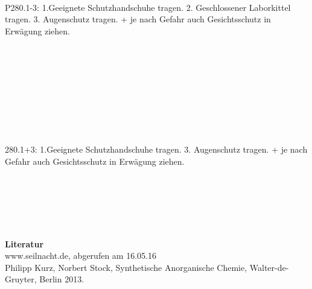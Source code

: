 \documentclass[12pt,a4paper,titlepage,headinclude,bibtotoc]{scrartcl}
\begin{document}
\textbf{}\\
\\
\\ 
P280.1-3: 1.Geeignete Schutzhandschuhe tragen.
2. Geschlossener Laborkittel tragen.
3. Augenschutz tragen. + je nach Gefahr auch Gesichtsschutz in Erwägung ziehen.\\
\\
\\
\\\\

\textbf{}\\
\\
\\
\\
\\
280.1+3: 1.Geeignete Schutzhandschuhe tragen.
3. Augenschutz tragen. + je nach Gefahr auch Gesichtsschutz in Erwägung ziehen.\\
\\
\\
\\
\\
 \\\\

\textbf{Literatur}\\
www.seilnacht.de, abgerufen am 16.05.16\\
Philipp Kurz, Norbert Stock, Synthetische Anorganische Chemie, Walter-de-Gruyter, Berlin
2013. 
\end{document}
